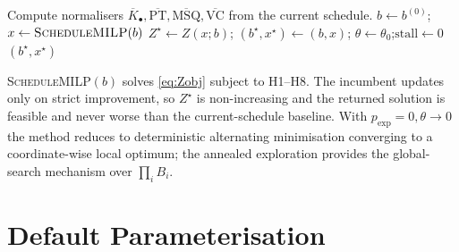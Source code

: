 \documentclass[12pt, letterpaper]{article}
\begin{document}
\begin{algorithm}[h]
\DontPrintSemicolon
\caption{Two-Step Iterative Base-Camp Optimisation with Exploration}
\BlankLine
Compute normalisers $\overline{K}_\bullet,\overline{\mathrm{PT}},
  \overline{\mathrm{MSQ}},\overline{\mathrm{VC}}$ from the current
  schedule.\;
$b\leftarrow b^{(0)}$;\quad
$x\leftarrow \textsc{ScheduleMILP}(b)$
$Z^\star\leftarrow Z(x;b)$;\quad
$(b^\star,x^\star)\leftarrow(b,x)$;\quad
$\theta\leftarrow\theta_0$;\quad$\mathrm{stall}\leftarrow0$\;
\Return $(b^\star,x^\star)$\;
\end{algorithm}

\noindent
\textsc{ScheduleMILP}$(b)$ solves \eqref{eq:Zobj} subject to H1--H8. The
incumbent updates only on strict improvement, so $Z^\star$ is
non-increasing and the returned solution is feasible and never worse
than the current-schedule baseline. With $p_{\mathrm{exp}}=0,
\theta\to0$ the method reduces to deterministic alternating minimisation
converging to a coordinate-wise local optimum; the annealed exploration
provides the global-search mechanism over $\prod_i B_i$.

\section{Default Parameterisation}
\end{document}
